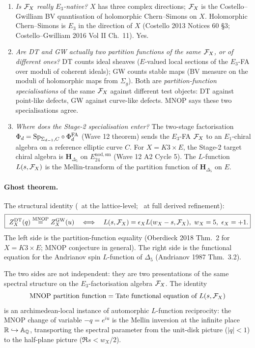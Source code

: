 \begin{enumerate}[label=\textbf{O.\arabic*},leftmargin=1.5em]
\item \emph{Is $\mathcal{F}_X$ really $E_3$-native?} $X$ has three complex
  directions; $\mathcal{F}_X$ is the Costello--Gwilliam BV quantisation of
  holomorphic Chern--Simons on $X$. Holomorphic Chern--Simons is
  $E_3$ in the direction of $X$ (Costello 2013 Notices 60 \S3;
  Costello--Gwilliam 2016 Vol II Ch.\ 11). Yes.
\item \emph{Are DT and GW actually two partition functions of the
  \emph{same} $\mathcal{F}_X$, or of different ones?} DT counts ideal
  sheaves ($E$-valued local sections of the $E_3$-FA over moduli
  of coherent ideals); GW counts stable maps (BV measure on the
  moduli of holomorphic maps from $\Sigma_g$). Both are
  \emph{partition-function specialisations} of the same $\mathcal{F}_X$
  against different test objects: DT against point-like defects,
  GW against curve-like defects. MNOP says these two
  specialisations agree.
\item \emph{Where does the Stage-2 specialisation enter?} The
  two-stage factorisation $\Phi_d=\mathrm{Sp}_{\Sigma_{d-1},C}\circ\Phi^{\mathrm{FA}}_d$
  (Wave 12 theorem) sends the $E_3$-FA $\mathcal{F}_X$ to an $E_1$-chiral
  algebra on a reference elliptic curve $C$. For $X=K3\times E$,
  the Stage-2 target chiral algebra is
  $\mathbf H_{\Delta_5}$ on $E^{\mathrm{nod,sm}}_{24}$ (Wave 12 A2
  Cycle 5). The $L$-function $L(s,\mathcal{F}_X)$ is the Mellin-transform
  of the partition function of $\mathbf H_{\Delta_5}$ on $E$.
\end{enumerate}

\paragraph{Ghost theorem.}
The structural identity (\ClaimStatusTheorem\ at the lattice-level;
\ClaimStatusConjectured\ at full derived refinement):
\[
\boxed{\
Z^{\mathrm{DT}}_X(q)\overset{\text{MNOP}}{=}Z^{\mathrm{GW}}_X(u)
\quad\Longleftrightarrow\quad
L(s,\mathcal{F}_X)=\epsilon_X L(w_X-s,\mathcal{F}_X),\ w_X=5,\ \epsilon_X=+1.
}
\]
The left side is the partition-function equality (Oberdieck 2018
Thm.\ 2 for $X=K3\times E$; MNOP conjecture in general). The
right side is the functional equation for the Andrianov spin
$L$-function of $\Delta_5$ (Andrianov 1987 Thm.\ 3.2).

The two sides are not independent: they are two presentations of
the same spectral structure on the $E_3$-factorisation algebra
$\mathcal{F}_X$. The identity
\[
\text{MNOP partition function} = \text{Tate functional equation
of }L(s,\mathcal{F}_X)
\]
is an archimedean-local instance of automorphic $L$-function
reciprocity: the MNOP change of variable $-q=e^{iu}$ is the
Mellin inversion at the infinite place
$\mathbb{R}\hookrightarrow\mathbb A_{\mathbb{Q}}$, transporting the spectral
parameter from the unit-disk picture ($|q|<1$) to the
half-plane picture ($\Re s<w_X/2$).

